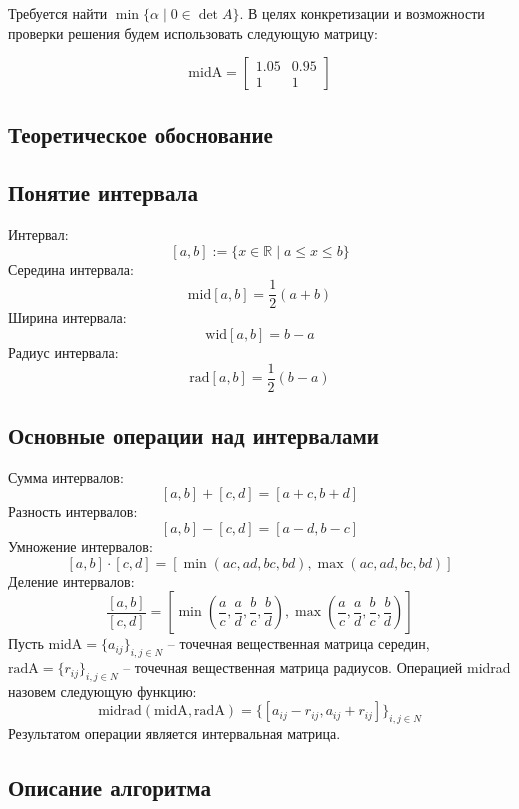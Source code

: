 \documentclass[a4paper,12pt]{article}
\begin{document}
Требуется найти \(\min\{\alpha \mid 0 \in \det A\}\). В целях конкретизации и возможности проверки решения будем использовать следующую матрицу:

\[
\text{midA} = \begin{bmatrix}
1.05 & 0.95 \\
1 & 1
\end{bmatrix} \tag{5}
\]

\begin{alignleft}
\section{Теоретическое обоснование}

\subsection{Понятие интервала}


Интервал:
\[
[a, b] := \{ x \in \mathbb{R} \mid a \leq x \leq b \} \tag{6}
\]
Середина интервала:
\[
\text{mid}[a, b] = \frac{1}{2} (a + b) \tag{7}
\]
Ширина интервала:
\[
\text{wid}[a, b] = b - a \tag{8}
\]
Радиус интервала:
\[
\text{rad}[a, b] = \frac{1}{2} (b - a) \tag{9}
\]



\subsection{Основные операции над интервалами}
Сумма интервалов:
\[
[a, b] + [c, d] = [a + c, b + d] \tag{10}
\]
Разность интервалов:
\[
[a, b] - [c, d] = [a - d, b - c] \tag{11}
\]
Умножение интервалов:
\[
[a, b] \cdot [c, d] = [\min(ac, ad, bc, bd), \max(ac, ad, bc, bd)] \tag{12}
\]
Деление интервалов:
\[
\frac{[a, b]}{[c, d]} = [\min(\frac{a}{c}, \frac{a}{d}, \frac{b}{c}, \frac{b}{d}), \max(\frac{a}{c}, \frac{a}{d}, \frac{b}{c}, \frac{b}{d})] \tag{13}
\]
Пусть \( \text{midA} = \{a_{ij}\}_{i,j\in N} \) – точечная вещественная матрица середин, \( \text{radA} = \{r_{ij}\}_{i,j\in N} \) – точечная вещественная матрица радиусов. Операцией midrad назовем следующую функцию:
\[
\text{midrad}(\text{midA}, \text{radA}) = \{[a_{ij} - r_{ij}, a_{ij} + r_{ij}]\}_{i,j\in N} \tag{14}
\]
Результатом операции является интервальная матрица.

\end{alignleft}


\subsection{Описание алгоритма}
\end{document}
